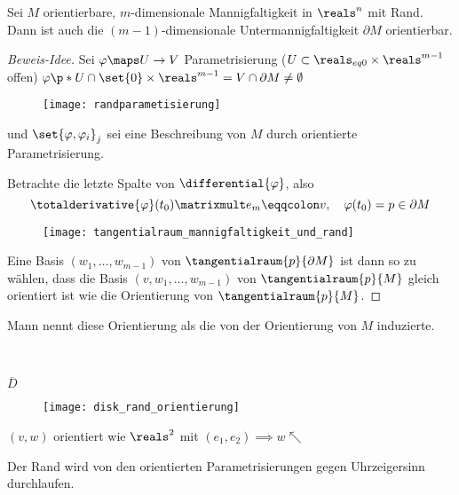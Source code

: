 \begin{satz}
  Sei \( M \) orientierbare, \( m \)-dimensionale Mannigfaltigkeit in \( \reals^n \) mit Rand.
  Dann ist auch die \( (m-1) \)-dimensionale Untermannigfaltigkeit \( \partial M \) orientierbar.
\end{satz}

\begin{proof}[Beweis-Idee]
  Sei \( \varphi\maps U\to V \) Parametrisierung (\( U\subset \reals_{eq 0}\times \reals^{m-1} \) offen) \sd \( \varphi\p*{ U\cap\set{0}\times \reals^{m-1}=V\cap\partial M\neq \emptyset } \)
  \begin{figure}[H]
    \centering
    \texttt{[image: randparametisierung]}
    \label{fig:randparametisierung}
  \end{figure}
  und \( \set{\varphi,\varphi_i}_j \) sei eine Beschreibung von \( M \) durch orientierte Parametrisierung.

  Betrachte die letzte Spalte von \( \differential{\varphi} \), also 
  \begin{equation*}
      \totalderivative{\varphi}(t_0)\matrixmult e_m\eqqcolon v,\quad \varphi(t_0)=p\in\partial M
  \end{equation*}
  \begin{figure}[H]
    \centering
    \texttt{[image: tangentialraum\_mannigfaltigkeit\_und\_rand]}
    \label{fig:tangentialraum_mannigfaltigkeit_und_rand}
  \end{figure}
  Eine Basis \( (w_1,\dotsc ,w_{m-1}) \) von \( \tangentialraum{p}{\partial M} \) ist dann so zu wählen, dass die Basis \( (v,w_1,\dotsc ,w_{m-1}) \) von \( \tangentialraum{p}{M} \) gleich orientiert ist wie die Orientierung von \( \tangentialraum{p}{M}  \).
\end{proof}
\begin{bemerkung*}
  Mann nennt diese Orientierung als die von der Orientierung von \( M \) induzierte.
\end{bemerkung*}
\begin{beispiel*}\

  \( \overline{D} \) 
  \begin{figure}[H]
    \centering
    \texttt{[image: disk\_rand\_orientierung]}
    \label{fig:disk_rand_orientierung}
  \end{figure}
  \( (v,w) \) orientiert wie \( \reals^2 \) mit \( (e_1,e_2)\implies w\nwarrow \)

  \timplies Der Rand wird von den orientierten Parametrisierungen gegen Uhrzeigersinn durchlaufen.
\end{beispiel*}


